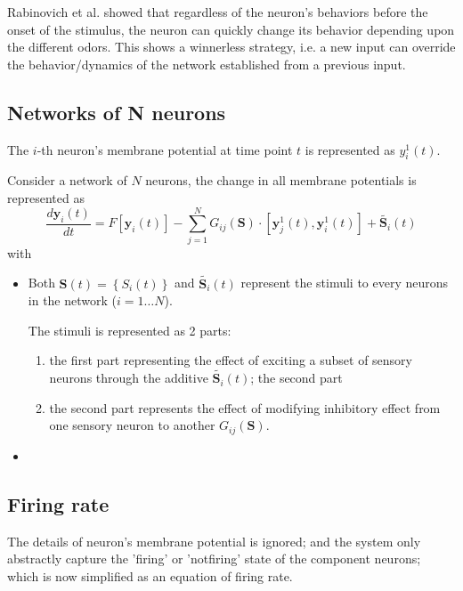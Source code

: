 Rabinovich et al. showed that regardless of the neuron's behaviors before the
onset of the stimulus, the neuron can quickly change its behavior depending upon
the different odors. This shows a winnerless strategy, i.e. a new input can
override the behavior/dynamics of the network established from a previous input.

\subsection{Networks of N neurons}

The $i$-th neuron's membrane potential at time point $t$ is represented as
$y_i^1(t)$. 

Consider a network of $N$ neurons, the change in all membrane potentials is
represented as
\begin{equation}
\frac{d\mathbf{y}_i(t)}{dt} = F[\mathbf{y}_i(t)] - \sum_{j=1}^N
G_{ij}(\mathbf{S}) \cdot \left[ \mathbf{y}_j^1(t), \mathbf{y}_i^1(t) \right]
+ \tilde{\mathbf{S}_i}(t)
\end{equation}
with 
\begin{itemize}
  \item Both $\mathbf{S}(t) = \left\{ S_i(t) \right\}$ and
  $\tilde{\mathbf{S}_i}(t)$ represent the stimuli to every neurons in the
  network ($i=1\ldots N$).

The stimuli is represented as 2 parts: 
\begin{enumerate}

  \item  the first part representing the effect of exciting a subset of
  sensory neurons through the additive $\tilde{\mathbf{S}_i}(t)$; the second
  part

  \item the second part represents the effect of modifying inhibitory effect
  from one sensory neuron to another $G_{ij}(\mathbf{S})$.
\end{enumerate}

  
  \item 
\end{itemize}

\subsection{Firing rate}

The details of neuron's membrane potential is ignored; and the system only
abstractly capture the 'firing' or 'notfiring' state of the component neurons;
which is now simplified as an equation of firing rate.

